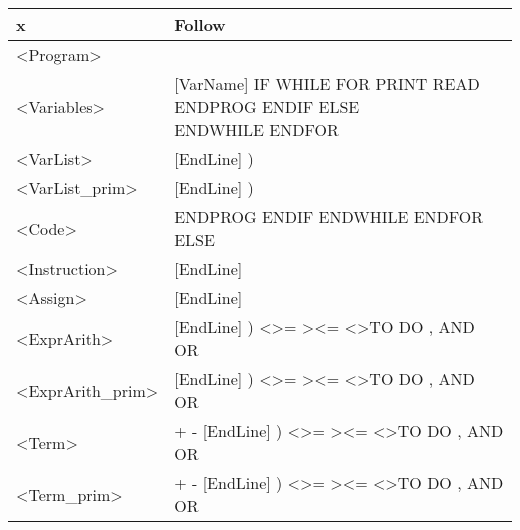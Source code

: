 \documentclass[12pt]{article}
\begin{document}
\begin{table}[H]
	\begin{tabular}{|l|l|}
		\hline
		x                                        & Follow                                                                                                         \\ \hline
		\textless{}Program\textgreater{}         &                                                                                                                \\ \hline
		\textless{}Variables\textgreater{}       & \makecell{{[}VarName{]} IF WHILE FOR PRINT READ  ENDPROG  ENDIF ELSE                                           \\ ENDWHILE ENDFOR}                                     \\ \hline
		\textless{}VarList\textgreater{}         & {[}EndLine{]} )                                                                                                \\ \hline
		\textless{}VarList\_prim\textgreater{}   & {[}EndLine{]} )                                                                                                \\ \hline
		\textless{}Code\textgreater{}            & ENDPROG ENDIF ENDWHILE ENDFOR ELSE                                                                             \\ \hline
		\textless{}Instruction\textgreater{}     & {[}EndLine{]}                                                                                                  \\ \hline
		\textless{}Assign\textgreater{}          & {[}EndLine{]}                                                                                                  \\ \hline
		\textless{}ExprArith\textgreater{}       & {[}EndLine{]} ) \textless \textgreater{}= \textgreater \textless{}= \textless{}\textgreater TO DO , AND OR     \\ \hline
		\textless{}ExprArith\_prim\textgreater{} & {[}EndLine{]} ) \textless \textgreater{}= \textgreater \textless{}= \textless{}\textgreater TO DO , AND OR     \\ \hline
		\textless{}Term\textgreater{}            & + - {[}EndLine{]} ) \textless \textgreater{}= \textgreater \textless{}= \textless{}\textgreater TO DO , AND OR \\ \hline
		\textless{}Term\_prim\textgreater{}      & + - {[}EndLine{]} ) \textless \textgreater{}= \textgreater \textless{}= \textless{}\textgreater TO DO , AND OR \\ \hline

\end{tabular}
\end{table}
\end{document}
